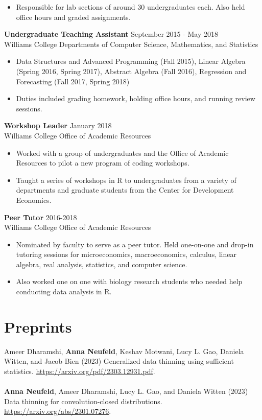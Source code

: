 \documentclass[margin, 10pt]{res} %
\begin{document}
\begin{resume}
\begin{itemize}
\item Responsible for lab sections of around 30 undergraduates each. Also held office hours and graded assignments.
\end{itemize}
{\textbf{Undergraduate Teaching Assistant}} \hfill September 2015 - May 2018 \\
Williams College Departments of Computer Science, Mathematics, and Statistics
\begin{itemize}
\item Data Structures and Advanced Programming (Fall 2015), Linear Algebra (Spring 2016, Spring 2017), Abstract Algebra (Fall 2016), Regression and Forecasting (Fall 2017, Spring 2018)
\item Duties included grading homework, holding office hours, and running review sessions. 
\end{itemize}
{\textbf{Workshop Leader}} \hfill January 2018 \\
Williams College Office of Academic Resources
\begin{itemize}
\item Worked with a group of undergraduates and the Office of Academic Resources to pilot a new program of coding workshops.
\item Taught a series of workshops in R to undergraduates from a variety of departments and graduate students from the Center for Development Economics. 
\end{itemize}
{\textbf{Peer Tutor}} \hfill 2016-2018 \\
Williams College Office of Academic Resources
\begin{itemize}
\item Nominated by faculty to serve as a peer tutor. Held one-on-one and drop-in tutoring sessions for microeconomics, macroeconomics, calculus, linear algebra, real analysis, statistics, and computer science.  
\item Also worked one on one with biology research students who needed help conducting data analysis in R. 
\end{itemize}

\section{Preprints} 
Ameer Dharamshi, \textbf{Anna Neufeld}, Keshav Motwani, Lucy L. Gao, Daniela Witten, and Jacob Bien (2023) Generalized data thinning using sufficient statistics. \href{https://arxiv.org/pdf/2303.12931.pdf}{https://arxiv.org/pdf/2303.12931.pdf}.  \\
\\
\textbf{Anna Neufeld}, Ameer Dharamshi, Lucy L. Gao, and Daniela Witten (2023) Data thinning for convolution-closed distributions. \href{https://arxiv.org/abs/2301.07276}{https://arxiv.org/abs/2301.07276}. 

\end{resume}
\end{document}
